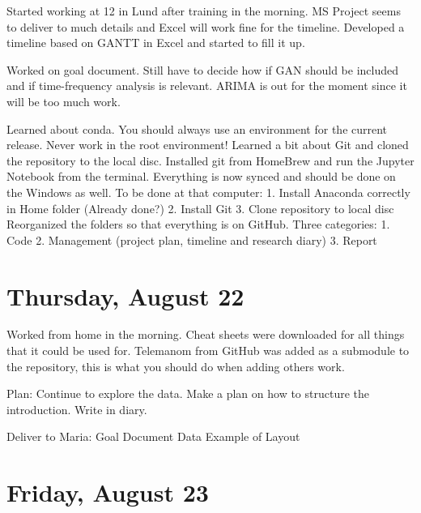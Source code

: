 \documentclass[11pt,letterpaper]{article}
\begin{document}
Started working at 12 in Lund after training in the morning. MS Project seems to deliver to much details and Excel will work fine for the timeline. Developed a timeline based on GANTT in Excel and started to fill it up.

Worked on goal document. Still have to decide how if GAN should be included and if time-frequency analysis is relevant. ARIMA is out for the moment since it will be too much work.

Learned about conda. You should always use an environment for the current release. Never work in the root environment! Learned a bit about Git and cloned the repository to the local disc. Installed git from HomeBrew and run the Jupyter Notebook from the terminal. Everything is now synced and should be done on the Windows as well. To be done at that computer: 
1. Install Anaconda correctly in Home folder (Already done?)
2. Install Git
3. Clone repository to local disc
Reorganized the folders so that everything is on GitHub. Three categories:
1. Code 
2. Management (project plan, timeline and research diary)
3. Report



\section*{Thursday, August 22}

Worked from home in the morning. Cheat sheets were downloaded for all things that it could be used for. Telemanom from GitHub was added as a submodule to the repository, this is what you should do when adding others work.

Plan:
Continue to explore the data.
Make a plan on how to structure the introduction.
Write in diary.

Deliver to Maria:
Goal Document
Data
Example of Layout

\section*{Friday, August 23}


\printbibliography 
\end{document}
